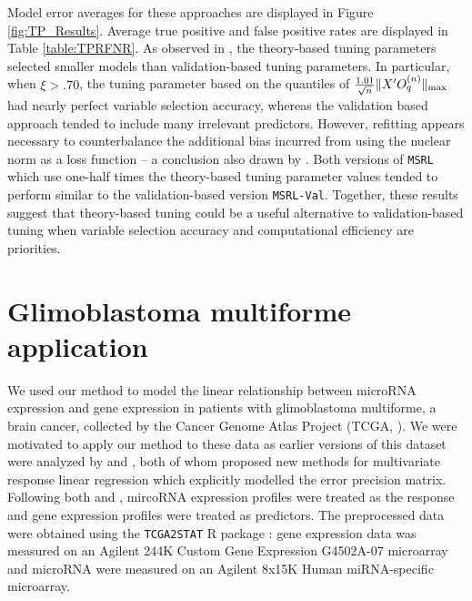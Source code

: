\documentclass[12pt]{article}
\begin{document}
Model error averages for these approaches are displayed in Figure \ref{fig:TP_Results}. Average true positive and false positive rates are displayed in Table \ref{table:TPRFNR}. As observed in \citet{belloni2011square}, the theory-based tuning parameters selected smaller models than validation-based tuning parameters. In particular, when $\xi > .70$, the tuning parameter based on the quantiles of $\frac{1.01}{\sqrt{n}}\|X'O^{(n)}_q\|_{\rm max}$ had nearly perfect variable selection accuracy, whereas the validation based approach tended to include many irrelevant predictors. However, refitting appears necessary to counterbalance the additional bias incurred from using the nuclear norm as a loss function -- a conclusion also drawn by \citet{belloni2011square}. Both versions of \texttt{MSRL} which use one-half times the theory-based tuning parameter values tended to perform similar to the validation-based version \texttt{MSRL-Val}. Together, these results suggest that theory-based tuning could be a useful alternative to validation-based tuning when variable selection accuracy and computational efficiency are priorities. 


\section{Glimoblastoma multiforme application}
We used our method to model the linear relationship between microRNA expression and gene expression in patients with glimoblastoma multiforme, a brain cancer, collected by the Cancer Genome Atlas Project (TCGA, \citet{weinstein2013cancer}). We were motivated to apply our method to these data as earlier versions of this dataset were analyzed by \citet{wang2015joint} and \citet{lee2012simultaneous}, both of whom proposed new methods for multivariate response linear regression which explicitly modelled the error precision matrix. Following both \citet{wang2015joint} and \citet{lee2012simultaneous}, mircoRNA expression profiles were treated as the response and gene expression profiles were treated as predictors. The preprocessed data were obtained using the \texttt{TCGA2STAT} R package \citep{wan2015tcga2stat}: gene expression data was measured on an Agilent 244K Custom Gene Expression G4502A-07 microarray and microRNA were measured on an Agilent 8x15K Human miRNA-specific microarray. 
\end{document}
